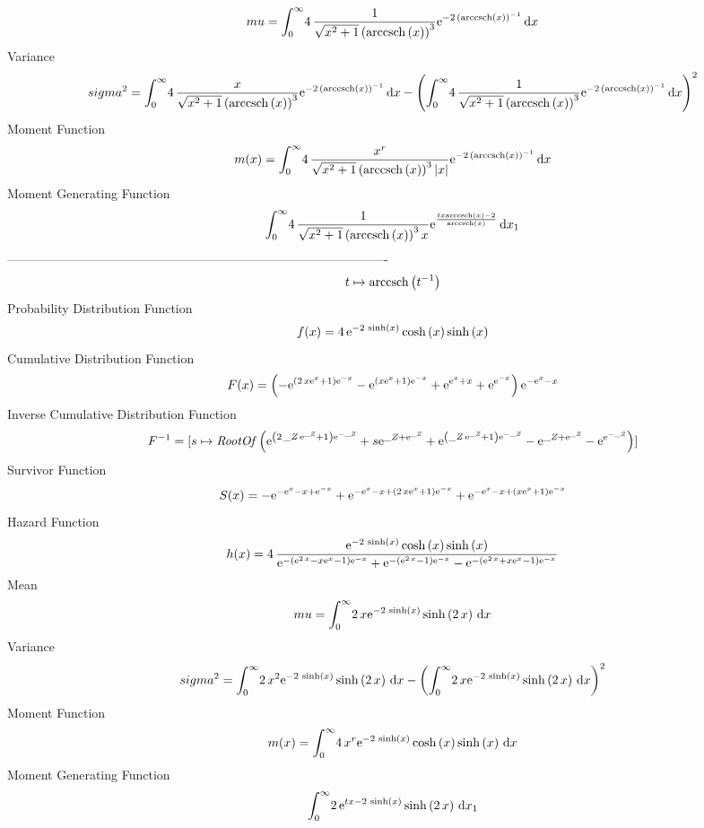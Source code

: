 \documentclass[12pt]{article}
\begin{document}
 $$ mu=\int_{0}^{\infty }\!4\,{\frac {1}{\sqrt {{x}^{2}+1} \left( 
{\rm arccsch} \left(x\right) \right) ^{3}}{{\rm e}^{-2\, \left( 
{\rm arccsch} \left(x\right) \right) ^{-1}}}}\,{\rm d}x
$$ Variance 
 $$ sigma^2 = \int_{0}^{\infty }\!4\,{\frac {x}{\sqrt {{x}^{2}+1} \left( 
{\rm arccsch} \left(x\right) \right) ^{3}}{{\rm e}^{-2\, \left( 
{\rm arccsch} \left(x\right) \right) ^{-1}}}}\,{\rm d}x- \left( \int_{0
}^{\infty }\!4\,{\frac {1}{\sqrt {{x}^{2}+1} \left( {\rm arccsch} 
\left(x\right) \right) ^{3}}{{\rm e}^{-2\, \left( {\rm arccsch} \left(
x\right) \right) ^{-1}}}}\,{\rm d}x \right) ^{2}
$$Moment Function 
 $$ m(x) = \int_{0}^{\infty }\!4\,{\frac {{x}^{r}}{\sqrt {{x}^{2}+1} \left( 
{\rm arccsch} \left(x\right) \right) ^{3} \left| x \right| }{{\rm e}^{
-2\, \left( {\rm arccsch} \left(x\right) \right) ^{-1}}}}\,{\rm d}x
$$ Moment Generating Function 
 $$\int_{0}^{\infty }\!4\,{\frac {1}{\sqrt {{x}^{2}+1} \left( 
{\rm arccsch} \left(x\right) \right) ^{3}x}{{\rm e}^{{\frac {tx
{\rm arccsch} \left(x\right)-2}{{\rm arccsch} \left(x\right)}}}}}
\,{\rm d}x_{{1}}
$$-------------------------------------------------------------------------------------------  \\$$t\mapsto {\rm arccsch} \left({t}^{-1}\right)
$$Probability Distribution Function 
$$  f(x)=4\,{{\rm e}^{-2\,\sinh \left( x \right) }}\cosh \left( x \right) \sinh
 \left( x \right) 
$$Cumulative Distribution Function  
 $$F(x)= \left( -{{\rm e}^{ \left( 2\,x{{\rm e}^{x}}+1 \right) {{\rm e}^{-x}}}
}-{{\rm e}^{ \left( x{{\rm e}^{x}}+1 \right) {{\rm e}^{-x}}}}+{{\rm e}
^{{{\rm e}^{x}}+x}}+{{\rm e}^{{{\rm e}^{-x}}}} \right) {{\rm e}^{-{
{\rm e}^{x}}-x}}
$$ Inverse Cumulative Distribution Function 
  $$F^{-1} = [s\mapsto {\it RootOf} \left( {{\rm e}^{ \left( 2\,{\it \_Z}\,{{\rm e}
^{{\it \_Z}}}+1 \right) {{\rm e}^{-{\it \_Z}}}}}+s{{\rm e}^{{\it \_Z}+
{{\rm e}^{{\it \_Z}}}}}+{{\rm e}^{ \left( {\it \_Z}\,{{\rm e}^{{\it 
\_Z}}}+1 \right) {{\rm e}^{-{\it \_Z}}}}}-{{\rm e}^{{\it \_Z}+{{\rm e}
^{{\it \_Z}}}}}-{{\rm e}^{{{\rm e}^{-{\it \_Z}}}}} \right) ]
$$Survivor Function 
 $$ S(x)=-{{\rm e}^{-{{\rm e}^{x}}-x+{{\rm e}^{-x}}}}+{{\rm e}^{-{{\rm e}^{x}}-
x+ \left( 2\,x{{\rm e}^{x}}+1 \right) {{\rm e}^{-x}}}}+{{\rm e}^{-{
{\rm e}^{x}}-x+ \left( x{{\rm e}^{x}}+1 \right) {{\rm e}^{-x}}}}
$$ Hazard Function 
 $$ h(x)=4\,{\frac {{{\rm e}^{-2\,\sinh \left( x \right) }}\cosh \left( x
 \right) \sinh \left( x \right) }{{{\rm e}^{- \left( {{\rm e}^{2\,x}}-
x{{\rm e}^{x}}-1 \right) {{\rm e}^{-x}}}}+{{\rm e}^{- \left( {{\rm e}^
{2\,x}}-1 \right) {{\rm e}^{-x}}}}-{{\rm e}^{- \left( {{\rm e}^{2\,x}}
+x{{\rm e}^{x}}-1 \right) {{\rm e}^{-x}}}}}}
$$Mean 
 $$ mu=\int_{0}^{\infty }\!2\,x{{\rm e}^{-2\,\sinh \left( x \right) }}\sinh
 \left( 2\,x \right) \,{\rm d}x
$$ Variance 
 $$ sigma^2 = \int_{0}^{\infty }\!2\,{x}^{2}{{\rm e}^{-2\,\sinh \left( x \right) }}
\sinh \left( 2\,x \right) \,{\rm d}x- \left( \int_{0}^{\infty }\!2\,x{
{\rm e}^{-2\,\sinh \left( x \right) }}\sinh \left( 2\,x \right) 
\,{\rm d}x \right) ^{2}
$$Moment Function 
 $$ m(x) = \int_{0}^{\infty }\!4\,{x}^{r}{{\rm e}^{-2\,\sinh \left( x \right) }}
\cosh \left( x \right) \sinh \left( x \right) \,{\rm d}x
$$ Moment Generating Function 
 $$\int_{0}^{\infty }\!2\,{{\rm e}^{tx-2\,\sinh \left( x \right) }}\sinh
 \left( 2\,x \right) \,{\rm d}x_{{1}}
$$
\end{document}
